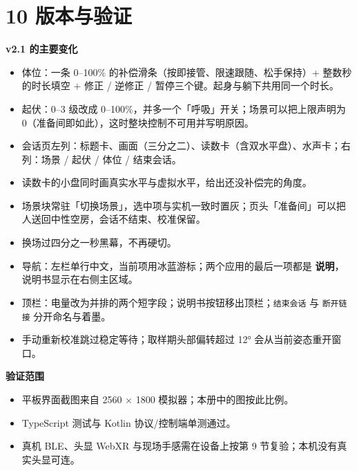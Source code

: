 \documentclass[
  chinese,
  letterpaper,
  DIV=11,
  numbers=noendperiod]{scrartcl}
\providecommand{\tightlist}{%
  \setlength{\itemsep}{0pt}\setlength{\parskip}{0pt}}
\begin{document}
\section{10 版本与验证}\label{ux7248ux672cux4e0eux9a8cux8bc1}

\textbf{v2.1 的主要变化}

\begin{itemize}
\tightlist
\item
  体位：一条 0--100\% 的补偿滑条（按即接管、限速跟随、松手保持）+
  整数秒的时长填空 + 修正 / 逆修正 /
  暂停三个键。起身与躺下共用同一个时长。
\item
  起伏：0--3 级改成 0--100\%，并多一个「呼吸」开关；场景可以把上限声明为
  0（准备间即如此），这时整块控制不可用并写明原因。
\item
  会话页左列：标题卡、画面（三分之二）、读数卡（含双水平盘）、水声卡；右列：场景
  / 起伏 / 体位 / 结束会话。
\item
  读数卡的小盘同时画真实水平与虚拟水平，给出还没补偿完的角度。
\item
  场景块常驻「切换场景」，选中项与实机一致时置灰；页头「准备间」可以把人送回中性空房，会话不结束、校准保留。
\item
  换场过四分之一秒黑幕，不再硬切。
\item
  导航：左栏单行中文，当前项用冰蓝游标；两个应用的最后一项都是
  \textbf{说明}，说明书显示在右侧主区域。
\item
  顶栏：电量改为并排的两个短字段；说明书按钮移出顶栏；\texttt{结束会话}
  与 \texttt{断开链接} 分开命名与着墨。
\item
  手动重新校准跳过稳定等待；取样期头部偏转超过 12°
  会从当前姿态重开窗口。
\end{itemize}

\textbf{验证范围}

\begin{itemize}
\tightlist
\item
  平板界面截图来自 2560 × 1800 模拟器；本册中的图按此比例。
\item
  TypeScript 测试与 Kotlin 协议/控制端单测通过。
\item
  真机 BLE、头显 WebXR 与现场手感需在设备上按第 9
  节复验；本机没有真实头显可连。
\end{itemize}
\end{document}
